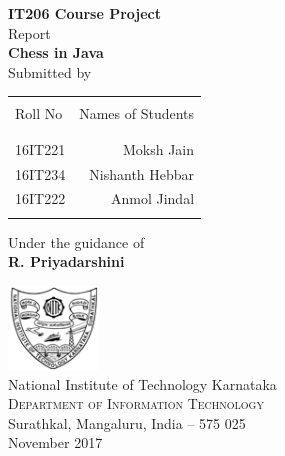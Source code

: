 \begin{titlepage}

\begin{center}

\textup{\small {\bf IT206 Course Project} \\ Report}\\[0.2in]

\Large \textbf {Chess in Java}\\[0.5in]


\normalsize Submitted by \\
\begin{table}[h]
\centering
\begin{tabular}{lr}\hline \\
Roll No & Names of Students \\ \\ \hline
\\
16IT221 & Moksh Jain \\
16IT234 & Nishanth Hebbar \\
16IT222 & Anmol Jindal\\ \\ \hline 
\end{tabular}
\end{table}

\vspace{.1in}
Under the guidance of\\
{\textbf{R. Priyadarshini}}\\[0.2in]


\vfill

\includegraphics[width=0.18\textwidth]{logo2.png}\\[0.1in]
\Large{National Institute of Technology Karnataka}\\
\normalsize
\textsc{Department of Information Technology}\\
Surathkal, Mangaluru, India -- 575 025 \\
\vspace{0.2cm}
November 2017

\end{center}

\end{titlepage}
